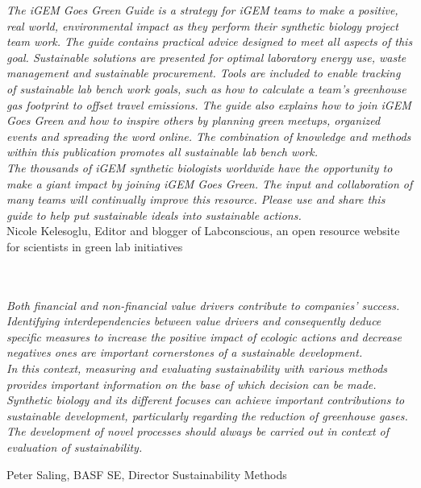 \thispagestyle{empty}

\vspace*{\fill}

\noindent \textit{The iGEM Goes Green Guide is a strategy for iGEM teams to make a positive, real world, environmental impact as they perform their synthetic biology project team work. The guide contains practical advice designed to meet all aspects of this goal. Sustainable solutions are presented for optimal laboratory energy use, waste management and sustainable procurement. Tools are included to enable tracking of sustainable lab bench work goals, such as how to calculate a team's greenhouse gas footprint to offset travel emissions. The guide also explains how to join iGEM Goes Green and how to inspire others by planning green meetups, organized events and spreading the word online. The combination of knowledge and methods within this publication promotes all sustainable lab bench work.} \\

\noindent \textit{The thousands of iGEM synthetic biologists worldwide have the opportunity to make a giant impact by joining iGEM Goes Green. The input and collaboration of many teams will continually improve this resource. Please use and share this guide to help put sustainable ideals into sustainable actions.} \\

Nicole Kelesoglu, Editor and blogger of Labconscious, an open resource website for scientists in green lab initiatives \\\bigskip
 \\\bigskip
 \\\bigskip

\noindent \textit{Both financial and non-financial value drivers contribute to companies' success. Identifying interdependencies between value drivers and consequently deduce specific measures to increase the positive impact of ecologic actions and decrease negatives ones are important cornerstones of a sustainable development.} \\
	
	
\noindent \textit{In this context, measuring and evaluating sustainability with various methods provides important information on the base of which decision can be made.} \\


\noindent \textit{Synthetic biology and its different focuses can achieve important contributions to sustainable development, particularly regarding the reduction of greenhouse gases. The development of novel processes should always be carried out in context of evaluation of sustainability.} \\\bigskip


Peter Saling, BASF SE, Director Sustainability Methods


\vspace*{\fill}